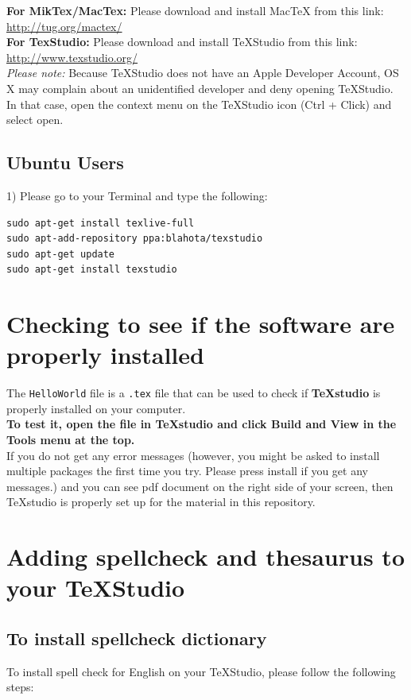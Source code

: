 \documentclass[]{article}
\begin{document}
\textbf{For MikTex/MacTex:}
Please download and install MacTeX from this link: \url{http://tug.org/mactex/} \\

\textbf{For TexStudio:}
Please download and install TeXStudio from this link: \url{http://www.texstudio.org/} \\

\textit{Please note:} Because TeXStudio does not have an Apple Developer Account, OS X may complain about an unidentified developer and deny opening TeXStudio. In that case, open the context menu on the TeXStudio icon (Ctrl + Click) and select open.

\subsection*{Ubuntu Users}

1) Please go to your Terminal and type the following:
\begin{verbatim}
sudo apt-get install texlive-full
sudo apt-add-repository ppa:blahota/texstudio 
sudo apt-get update 
sudo apt-get install texstudio
\end{verbatim}


\section*{Checking to see if the software are properly installed}

The \texttt{HelloWorld} file is a \texttt{.tex} file that can be used to check if \textbf{TeXstudio} is properly installed on your computer. \\

\textbf{To test it, open the file in TeXstudio and click Build and View in the Tools menu at the top. } \\

If you do not get any error messages (however, you might be asked to install multiple packages the first time you try. Please press install if you get any messages.) and you can see pdf document on the right side of your screen,  then TeXstudio is properly set up for the material in this repository. 

\section*{Adding spellcheck and thesaurus to your TeXStudio}

\subsection*{To install spellcheck dictionary}
To install spell check for English on your TeXStudio, please follow the following steps:
\end{document}
